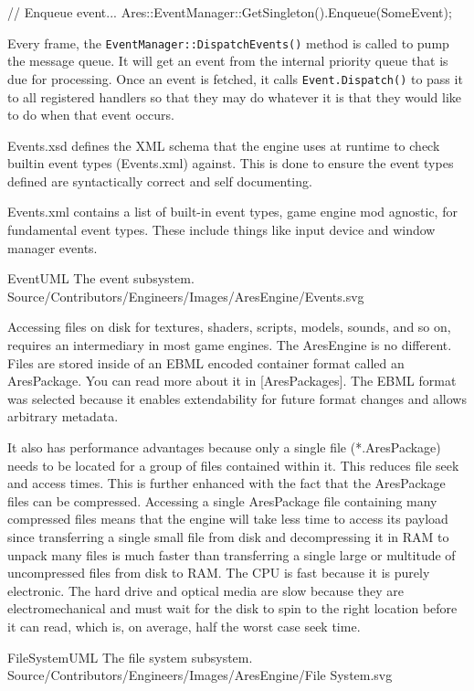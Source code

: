 // Enqueue event...
Ares::EventManager::GetSingleton().Enqueue(SomeEvent);
\stopCodeExample

Every frame, the {\tt EventManager::DispatchEvents()} method is called to pump the message queue. It will get an event from the internal priority queue that is due for processing. Once an event is fetched, it calls {\tt Event.Dispatch()} to pass it to all registered handlers so that they may do whatever it is that they would like to do when that event occurs.

Events.xsd defines the XML schema that the engine uses at runtime to check builtin event types (Events.xml) against. This is done to ensure the event types defined are syntactically correct and self documenting.

Events.xml contains a list of built-in event types, game engine mod agnostic, for fundamental event types. These include things like input device and window manager events.

\FullPageDiagram
    {EventUML}
    {The event subsystem.}
    {Source/Contributors/Engineers/Images/AresEngine/Events.svg}

\page 
{}
Accessing files on disk for textures, shaders, scripts, models, sounds, and so on, requires an intermediary in most game engines. The AresEngine is no different. Files are stored inside of an EBML encoded container format called an AresPackage. You can read more about it in [AresPackages]. The EBML format was selected because it enables extendability for future format changes and allows arbitrary metadata. 

It also has performance advantages because only a single file (*.AresPackage) needs to be located for a group of files contained within it. This reduces file seek and access times. This is further enhanced with the fact that the AresPackage files can be compressed. Accessing a single AresPackage file containing many compressed files means that the engine will take less time to access its payload since transferring a single small file from disk and decompressing it in RAM to unpack many files is much faster than transferring a single large or multitude of uncompressed files from disk to RAM. The CPU is fast because it is purely electronic. The hard drive and optical media are slow because they are electromechanical and must wait for the disk to spin to the right location before it can read, which is, on average, half the worst case seek time.

\FullPageDiagram
    {FileSystemUML}
    {The file system subsystem.}
    {Source/Contributors/Engineers/Images/AresEngine/File System.svg}

